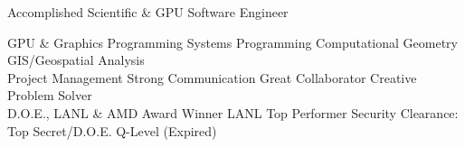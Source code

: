 \begin{headerbox}[boxrule=0.3mm]
{Accomplished Scientific \& GPU Software Engineer}
\begin{center}
    GPU \& Graphics Programming \idot Systems Programming \idot Computational Geometry \idot GIS/Geospatial Analysis \\
    Project Management \idot Strong Communication \idot Great Collaborator \idot Creative Problem Solver \\
    D.O.E., LANL \& AMD Award Winner \idot LANL Top Performer \idot Security Clearance: Top Secret/D.O.E. Q-Level (Expired)\\
\end{center}
\end{headerbox}
